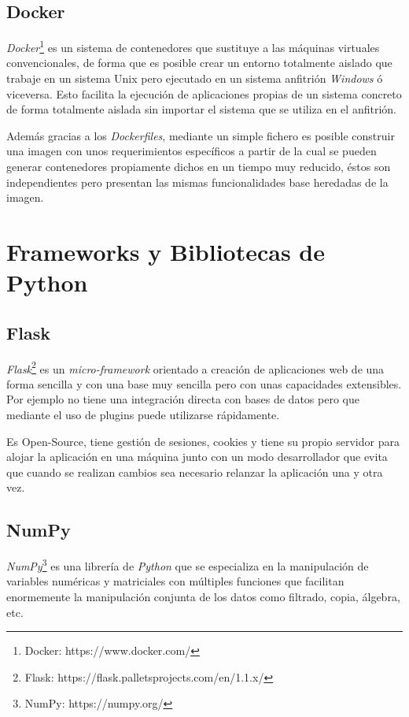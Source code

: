 \subsection{Docker}
\emph{Docker}\footnote{Docker: https://www.docker.com/} es un sistema de contenedores que sustituye a las máquinas virtuales convencionales, de forma que es posible crear un entorno totalmente aislado que trabaje en un sistema Unix pero ejecutado en un sistema anfitrión \emph{Windows} ó viceversa. Esto facilita la ejecución de aplicaciones propias de un sistema concreto de forma totalmente aislada sin importar el sistema que se utiliza en el anfitrión.

Además gracias a los \emph{Dockerfiles}, mediante un simple fichero es posible construir una imagen con unos requerimientos específicos a partir de la cual se pueden generar contenedores propiamente dichos en un tiempo muy reducido, éstos son independientes pero presentan las mismas funcionalidades base heredadas de la imagen.

\section{Frameworks y Bibliotecas de Python}

\subsection{Flask}
\emph{Flask}\footnote{Flask: https://flask.palletsprojects.com/en/1.1.x/} es un \emph{micro-framework} orientado a creación de aplicaciones web de una forma sencilla y con una base muy sencilla pero con unas capacidades extensibles. Por ejemplo no tiene una integración directa con bases de datos pero que mediante el uso de plugins puede utilizarse rápidamente.

Es Open-Source, tiene gestión de sesiones, cookies y tiene su propio servidor para alojar la aplicación en una máquina junto con un modo desarrollador que evita que cuando se realizan cambios sea necesario relanzar la aplicación una y otra vez.

\subsection{NumPy}
\emph{NumPy}\footnote{NumPy: https://numpy.org/} es una librería de \emph{Python} que se especializa en la manipulación de variables numéricas y matriciales con múltiples funciones que facilitan enormemente la manipulación conjunta de los datos como filtrado, copia, álgebra, etc.

